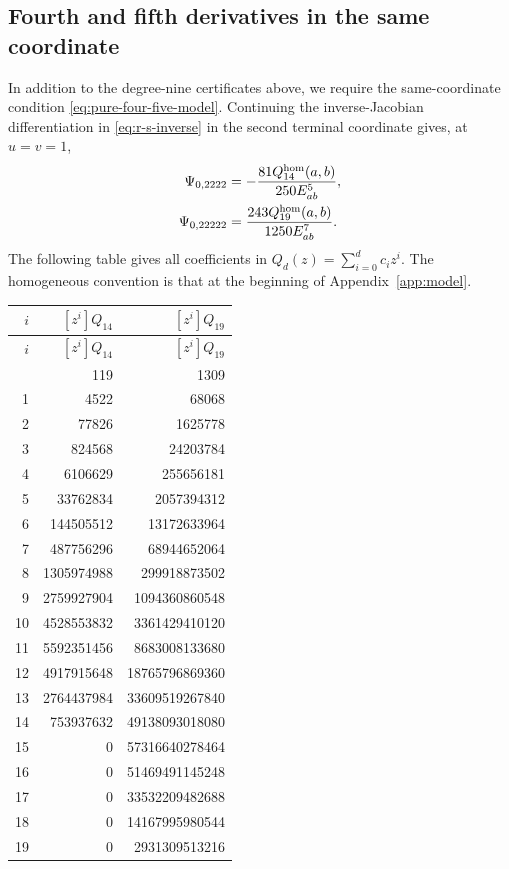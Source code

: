 \documentclass[11pt,a4paper]{article}
\numberwithin{equation}{section}
\theoremstyle{remark}
\begin{document}
\subsection{Fourth and fifth derivatives in the same coordinate}
\label{app:four-five}
In addition to the degree-nine certificates above, we require the
same-coordinate condition \eqref{eq:pure-four-five-model}. Continuing
the inverse-Jacobian differentiation in \eqref{eq:r-s-inverse} in the
second terminal coordinate gives, at $u=v=1$,
\begin{align}
 \Psi_{0,2222}
   &=-\frac{81Q_{14}^{\rm hom}(a,b)}{250E_{ab}^5},\label{eq:Psi-four}\\
 \Psi_{0,22222}
   &=\frac{243Q_{19}^{\rm hom}(a,b)}{1250E_{ab}^7}.\label{eq:Psi-five}
\end{align}
The following table gives all coefficients in
$Q_d(z)=\sum_{i=0}^d c_i z^i$. The homogeneous convention is that
at the beginning of Appendix~\ref{app:model}.
\begin{center}
\small
\begin{longtable}{r rr}
\toprule
$i$ & $[z^i]Q_{14}$ & $[z^i]Q_{19}$\\
\midrule
\endfirsthead
\toprule
$i$ & $[z^i]Q_{14}$ & $[z^i]Q_{19}$\\
\midrule
\endhead
\bottomrule
\endfoot
0 & 119 & 1309\\
1 & 4522 & 68068\\
2 & 77826 & 1625778\\
3 & 824568 & 24203784\\
4 & 6106629 & 255656181\\
5 & 33762834 & 2057394312\\
6 & 144505512 & 13172633964\\
7 & 487756296 & 68944652064\\
8 & 1305974988 & 299918873502\\
9 & 2759927904 & 1094360860548\\
10 & 4528553832 & 3361429410120\\
11 & 5592351456 & 8683008133680\\
12 & 4917915648 & 18765796869360\\
13 & 2764437984 & 33609519267840\\
14 & 753937632 & 49138093018080\\
15 & 0 & 57316640278464\\
16 & 0 & 51469491145248\\
17 & 0 & 33532209482688\\
18 & 0 & 14167995980544\\
19 & 0 & 2931309513216\\
\end{longtable}
\end{center}
\end{document}
